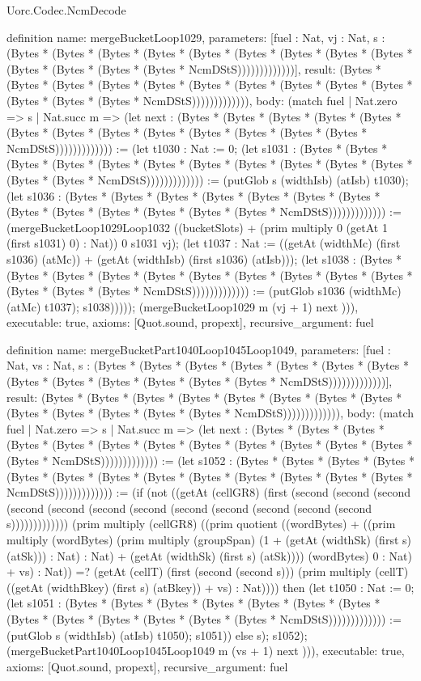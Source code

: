 \begin{lexlean}{Uorc.Codec.NcmDecode}
\begin{semanticmodule}
definition{
  name: mergeBucketLoop1029,
  parameters: [fuel : Nat, vj : Nat, s : (Bytes * (Bytes * (Bytes * (Bytes * (Bytes * (Bytes * (Bytes * (Bytes * (Bytes * (Bytes * (Bytes * (Bytes * (Bytes * NcmDStS)))))))))))))],
  result: (Bytes * (Bytes * (Bytes * (Bytes * (Bytes * (Bytes * (Bytes * (Bytes * (Bytes * (Bytes * (Bytes * (Bytes * (Bytes * NcmDStS))))))))))))),
  body: (match fuel
    | Nat.zero => s
    | Nat.succ m => (let next : (Bytes * (Bytes * (Bytes * (Bytes * (Bytes * (Bytes * (Bytes * (Bytes * (Bytes * (Bytes * (Bytes * (Bytes * (Bytes * NcmDStS))))))))))))) := (let t1030 : Nat := 0; (let s1031 : (Bytes * (Bytes * (Bytes * (Bytes * (Bytes * (Bytes * (Bytes * (Bytes * (Bytes * (Bytes * (Bytes * (Bytes * (Bytes * NcmDStS))))))))))))) := (putGlob s (widthIsb) (atIsb) t1030); (let s1036 : (Bytes * (Bytes * (Bytes * (Bytes * (Bytes * (Bytes * (Bytes * (Bytes * (Bytes * (Bytes * (Bytes * (Bytes * (Bytes * NcmDStS))))))))))))) := (mergeBucketLoop1029Loop1032 ((bucketSlots) + (prim multiply 0 (getAt 1 (first s1031) 0) : Nat)) 0 s1031 vj); (let t1037 : Nat := ((getAt (widthMc) (first s1036) (atMc)) + (getAt (widthIsb) (first s1036) (atIsb))); (let s1038 : (Bytes * (Bytes * (Bytes * (Bytes * (Bytes * (Bytes * (Bytes * (Bytes * (Bytes * (Bytes * (Bytes * (Bytes * (Bytes * NcmDStS))))))))))))) := (putGlob s1036 (widthMc) (atMc) t1037); s1038))))); (mergeBucketLoop1029 m (vj + 1) next ))),
  executable: true,
  axioms: [Quot.sound, propext],
  recursive_argument: fuel
}

definition{
  name: mergeBucketPart1040Loop1045Loop1049,
  parameters: [fuel : Nat, vs : Nat, s : (Bytes * (Bytes * (Bytes * (Bytes * (Bytes * (Bytes * (Bytes * (Bytes * (Bytes * (Bytes * (Bytes * (Bytes * (Bytes * NcmDStS)))))))))))))],
  result: (Bytes * (Bytes * (Bytes * (Bytes * (Bytes * (Bytes * (Bytes * (Bytes * (Bytes * (Bytes * (Bytes * (Bytes * (Bytes * NcmDStS))))))))))))),
  body: (match fuel
    | Nat.zero => s
    | Nat.succ m => (let next : (Bytes * (Bytes * (Bytes * (Bytes * (Bytes * (Bytes * (Bytes * (Bytes * (Bytes * (Bytes * (Bytes * (Bytes * (Bytes * NcmDStS))))))))))))) := (let s1052 : (Bytes * (Bytes * (Bytes * (Bytes * (Bytes * (Bytes * (Bytes * (Bytes * (Bytes * (Bytes * (Bytes * (Bytes * (Bytes * NcmDStS))))))))))))) := (if (not ((getAt (cellGR8) (first (second (second (second (second (second (second (second (second (second (second (second (second s))))))))))))) (prim multiply (cellGR8) ((prim quotient ((wordBytes) + ((prim multiply (wordBytes) (prim multiply (groupSpan) (1 + (getAt (widthSk) (first s) (atSk))) : Nat) : Nat) + (getAt (widthSk) (first s) (atSk)))) (wordBytes) 0 : Nat) + vs) : Nat)) =? (getAt (cellT) (first (second (second s))) (prim multiply (cellT) ((getAt (widthBkey) (first s) (atBkey)) + vs) : Nat)))) then (let t1050 : Nat := 0; (let s1051 : (Bytes * (Bytes * (Bytes * (Bytes * (Bytes * (Bytes * (Bytes * (Bytes * (Bytes * (Bytes * (Bytes * (Bytes * (Bytes * NcmDStS))))))))))))) := (putGlob s (widthIsb) (atIsb) t1050); s1051)) else s); s1052); (mergeBucketPart1040Loop1045Loop1049 m (vs + 1) next ))),
  executable: true,
  axioms: [Quot.sound, propext],
  recursive_argument: fuel
}


\end{semanticmodule}
\end{lexlean}
